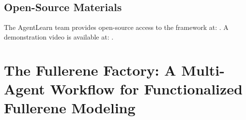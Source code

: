 \subsection*{Open-Source Materials}

The AgentLearn team provides open-source access to the framework at:  
.  
A demonstration video is available at: .




\section{The Fullerene Factory: A Multi-Agent Workflow for Functionalized Fullerene Modeling}

